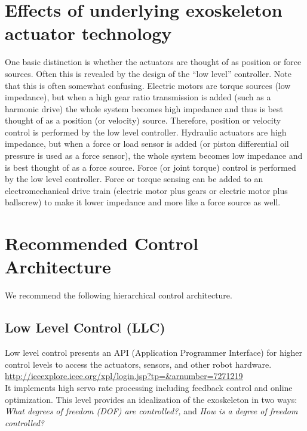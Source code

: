 \documentclass[letterpaper,12pt,fullpage]{article}
\begin{document}



\section{Effects of underlying exoskeleton actuator technology}

One basic distinction is whether the actuators are thought of as position
or force sources. Often this is revealed by the design of the ``low level''
controller. Note that this is often somewhat confusing. Electric motors
are torque sources (low impedance), but when a high gear ratio transmission
is added (such as a harmonic drive) the whole system becomes high impedance
and thus is best thought of as a position (or velocity) source. Therefore,
position or velocity 
control is performed by the low level controller. Hydraulic actuators
are high impedance, but when a force or load sensor is added (or piston differential
oil pressure is used as a force sensor), the whole system becomes low impedance
and is best thought of as a force source. Force (or joint torque) control is
performed by the low level controller. Force or torque sensing can be added to an
electromechanical drive train (electric motor plus gears or electric
motor plus ballscrew)
to make it lower impedance and more like a force source as well.

\section{Recommended Control Architecture}
\label{sec:architecture}

We recommend the following hierarchical control architecture.

\subsection{Low Level Control (LLC)}

Low level control presents an API (Application Programmer Interface)
for higher control levels
to access the actuators, sensors, and other robot hardware.\\
\url{http://ieeexplore.ieee.org/xpl/login.jsp?tp=&arnumber=7271219}\\
It implements high servo rate processing including feedback control and online
optimization.
This level provides an idealization of the exoskeleton in two ways: 
{\it What degrees of freedom (DOF) are controlled?,} and 
{\it How is a degree of freedom controlled?}
\end{document}
